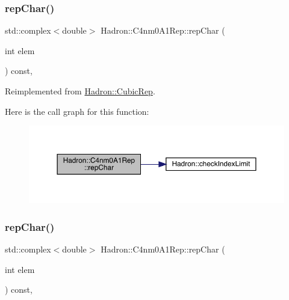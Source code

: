 \subsubsection{\texorpdfstring{repChar()}{repChar()}\hspace{0.1cm}{\footnotesize\ttfamily [2/3]}}
{\footnotesize\ttfamily std\+::complex$<$double$>$ Hadron\+::\+C4nm0\+A1\+Rep\+::rep\+Char (\begin{DoxyParamCaption}\item[{int}]{elem }\end{DoxyParamCaption}) const\hspace{0.3cm}{\ttfamily [inline]}, {\ttfamily [virtual]}}



Reimplemented from \mbox{\hyperlink{structHadron_1_1CubicRep_af45227106e8e715e84b0af69cd3b36f8}{Hadron\+::\+Cubic\+Rep}}.

Here is the call graph for this function\+:
\nopagebreak
\begin{figure}[H]
\begin{center}
\leavevmode
\includegraphics[width=350pt]{d8/d28/structHadron_1_1C4nm0A1Rep_ac54e244df5f9d7618d3033c48a7fb020_cgraph}
\end{center}
\end{figure}
\mbox{\label{structHadron_1_1C4nm0A1Rep_ac54e244df5f9d7618d3033c48a7fb020}} 
\subsubsection{\texorpdfstring{repChar()}{repChar()}\hspace{0.1cm}{\footnotesize\ttfamily [3/3]}}
{\footnotesize\ttfamily std\+::complex$<$double$>$ Hadron\+::\+C4nm0\+A1\+Rep\+::rep\+Char (\begin{DoxyParamCaption}\item[{int}]{elem }\end{DoxyParamCaption}) const\hspace{0.3cm}{\ttfamily [inline]}, {\ttfamily [virtual]}}



